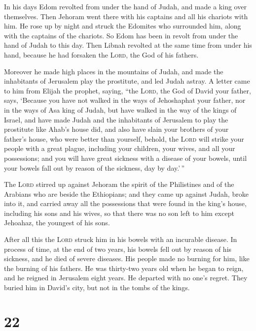  In his days Edom revolted from under the hand of Judah,
and made a king over themselves.  Then Jehoram went there
with his captains and all his chariots with him. He rose up by night and
struck the Edomites who surrounded him, along with the captains of the
chariots.  So Edom has been in revolt from under the hand
of Judah to this day. Then Libnah revolted at the same time from under
his hand, because he had forsaken the \textsc{Lord}, the God of his
fathers.

 Moreover he made high places in the mountains of Judah,
and made the inhabitants of Jerusalem play the prostitute, and led Judah
astray.  A letter came to him from Elijah the prophet,
saying, ``the \textsc{Lord}, the God of David your father, says,
`Because you have not walked in the ways of Jehoshaphat your father, nor
in the ways of Asa king of Judah,  but have walked in the
way of the kings of Israel, and have made Judah and the inhabitants of
Jerusalem to play the prostitute like Ahab's house did, and also have
slain your brothers of your father's house, who were better than
yourself,  behold, the \textsc{Lord} will strike your
people with a great plague, including your children, your wives, and all
your possessions;  and you will have great sickness with
a disease of your bowels, until your bowels fall out by reason of the
sickness, day by day.'\,''

 The \textsc{Lord} stirred up against Jehoram the spirit
of the Philistines and of the Arabians who are beside the Ethiopians;
 and they came up against Judah, broke into it, and
carried away all the possessions that were found in the king's house,
including his sons and his wives, so that there was no son left to him
except Jehoahaz, the youngest of his sons.

 After all this the \textsc{Lord} struck him in his
bowels with an incurable disease.  In process of time, at
the end of two years, his bowels fell out by reason of his sickness, and
he died of severe diseases. His people made no burning for him, like the
burning of his fathers.  He was thirty-two years old when
he began to reign, and he reigned in Jerusalem eight years. He departed
with no one's regret. They buried him in David's city, but not in the
tombs of the kings.

\hypertarget{section-21}{%
\section{22}\label{section-21}}

